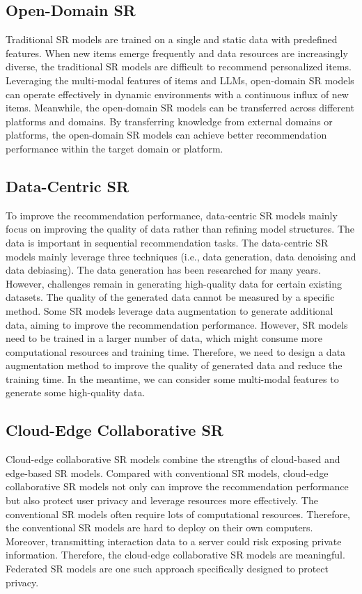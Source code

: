 \documentclass[review]{fcs}
\begin{document}
	\subsection{Open-Domain SR}
	Traditional SR models are trained on a single and static data with predefined features. When new items emerge frequently and data resources are increasingly diverse, the traditional SR models are difficult to recommend personalized items. Leveraging the multi-modal features of items and LLMs, open-domain SR models can operate effectively in dynamic environments with a continuous influx of new items. Meanwhile, the open-domain SR models can be transferred across different platforms and domains. By transferring knowledge from external domains or platforms, the open-domain SR models can achieve better recommendation performance within the target domain or platform.
	\subsection{Data-Centric SR}
	To improve the recommendation performance, data-centric SR models mainly focus on improving the quality of data rather than refining model structures. The data is important in sequential recommendation tasks. The data-centric SR models mainly leverage three techniques (i.e., data generation, data denoising and data debiasing). The data generation has been researched for many years.  However, challenges remain in generating high-quality data for certain existing datasets. The quality of the generated data cannot be measured by a specific method. Some SR models leverage data augmentation to generate additional data, aiming to improve the recommendation performance. However, SR models need to be trained in a larger number of data, which might consume more computational resources and training time. Therefore, we need to design a data augmentation method to improve the quality of generated data and reduce the training time. In the meantime, we can consider some multi-modal features to generate some high-quality data.
	\subsection{Cloud-Edge Collaborative SR}
	Cloud-edge collaborative SR models combine the strengths of cloud-based and edge-based SR models. Compared with conventional SR models, cloud-edge collaborative SR models not only can improve the recommendation performance but also protect user privacy and leverage resources more effectively. The conventional SR models often require lots of computational resources. Therefore, the conventional SR models are hard to deploy on their own computers. Moreover, transmitting interaction data to a server could risk exposing private information. Therefore, the cloud-edge collaborative SR models are meaningful. Federated SR models are one such approach specifically designed to protect privacy.
\end{document}
